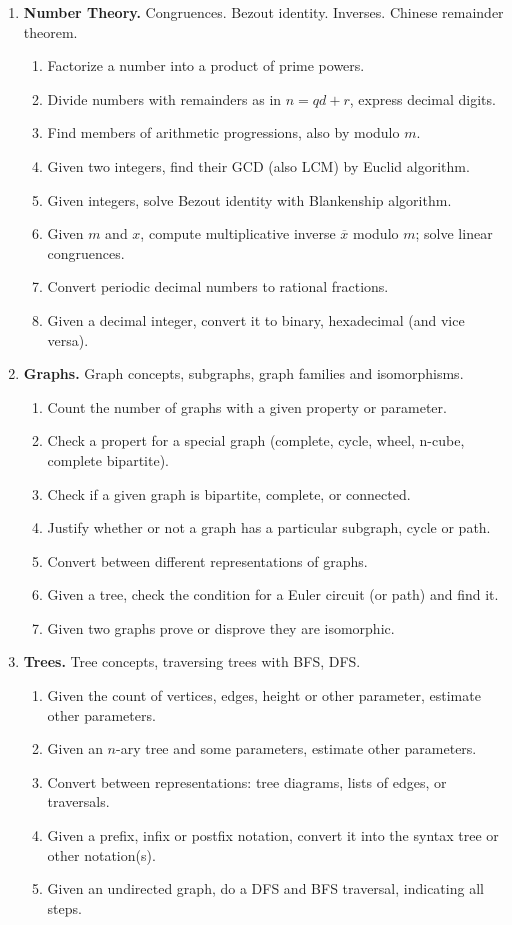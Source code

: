 \documentclass[a4paper,12pt]{article}
\begin{document}
{\small
\begin{enumerate}

\item \textbf{Number Theory.} Congruences. Bezout identity. Inverses. Chinese remainder theorem.
\begin{enumerate}
\item Factorize a number into a product of prime powers.
\item Divide numbers with remainders as in $n = qd + r$, express decimal digits.
\item Find members of arithmetic progressions, also by modulo $m$. 
\item Given two integers, find their GCD (also LCM) by Euclid algorithm.
\item Given integers, solve Bezout identity with Blankenship algorithm.
\item Given $m$ and $x$, compute 
multiplicative inverse $\overline{x}$ modulo $m$; solve linear congruences.
\item Convert periodic decimal numbers to rational fractions.
\item Given a decimal integer, convert it to binary, hexadecimal (and vice versa).
\end{enumerate}

\item \textbf{Graphs.} Graph concepts, subgraphs, graph families and isomorphisms.
\begin{enumerate}
\item Count the number of graphs with a given property or parameter.
\item Check a propert for a special graph (complete, cycle, wheel, n-cube, complete bipartite).
\item Check if a given graph is bipartite, complete, or connected.
\item Justify whether or not a graph has a particular subgraph, cycle or path.
\item Convert between different representations of graphs.
\item Given a tree, check the condition for a Euler circuit (or path) and find it.
\item Given two graphs prove or disprove they are isomorphic.
\end{enumerate}

\item \textbf{Trees.} Tree concepts, traversing trees with BFS, DFS. 
\begin{enumerate}
\item Given the count of vertices, edges, height or other parameter, estimate other parameters.
\item Given an $n$-ary tree and some parameters, estimate other parameters.
\item Convert between representations: tree diagrams, lists of edges, or traversals.
\item Given a prefix, infix or postfix notation, convert it into the syntax tree or other notation(s).
\item Given an undirected graph, do a DFS and BFS traversal, indicating all steps.
\end{enumerate}
\end{enumerate}
}
\end{document}
